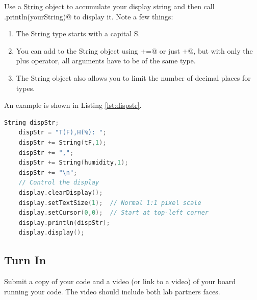 Use a \href{https://www.arduino.cc/reference/en/language/variables/data-types/stringobject/}{String} 
object to accumulate your display string and then call \lstinline@display.println(yourString)@ 
to display it. Note a few things:
\begin{enumerate}
	\item The String type starts with a capital S.
	\item You can add to the String object using \lstinline@+=@ or just \lstinline@+@, 
		but with only the plus operator, all arguments have to be of the same type. 
	\item The String object also allows you to limit the number of decimal places for \lstinline@float@ types. 
\end{enumerate}
An example is shown in Listing \ref{lst:dispstr}.
\begin{lstlisting}[caption={This is an example of using a String 
		object to display text and float variables. The floats are 
		limited to 1 decimal place such that 7.123 would be displayed as 7.1.},
		label={lst:dispstr},language=C++]
	String dispStr;
	dispStr = "T(F),H(%): ";
	dispStr += String(tF,1);
	dispStr += ",";
	dispStr += String(humidity,1);
	dispStr += "\n";
	// Control the display  
	display.clearDisplay();
	display.setTextSize(1);  // Normal 1:1 pixel scale
	display.setCursor(0,0);  // Start at top-left corner
	display.println(dispStr);
	display.display();
\end{lstlisting}

\subsection{Turn In}
Submit a copy of your code and a video (or link to a video) of your board running your code. The 
video should include both lab partners faces.
